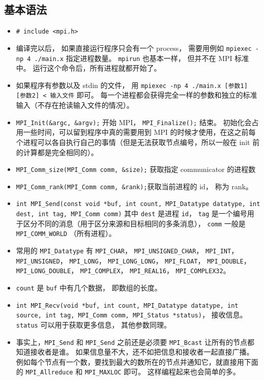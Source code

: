 \subsection{基本语法}
\begin{itemize}
\item \verb|# include <mpi.h>|
\item 编译完以后， 如果直接运行程序只会有一个 process， 需要用例如 \verb|mpiexec -np 4 ./main.x| 指定进程数量。 \verb|mpirun| 也基本一样， 但并不在 MPI 标准中。 运行这个命令后，所有进程就都开始了。
\item 如果程序有参数以及 stdin 的文件， 用 \verb`mpiexec -np 4 ./main.x [参数1] [参数2] < 输入文件` 即可。 每一个进程都会获得完全一样的参数和独立的标准输入（不存在抢读输入文件的情况）。
\item \verb|MPI_Init(&argc, &argv);| 开始 MPI， \verb|MPI_Finalize();| 结束。 初始化会占用一些时间，可以留到程序中真的需要用到 MPI 的时候才使用，在这之前每个进程可以各自执行自己的事情（但是无法获取节点编号，所以一般在 init 前的计算都是完全相同的）。
\item \verb|MPI_Comm_size(MPI_Comm comm, &size);| 获取指定 communicator 的进程数
\item \verb|MPI_Comm_rank(MPI_Comm comm, &rank);|获取当前进程的 id， 称为 rank。
\item \verb|int MPI_Send(const void *buf, int count, MPI_Datatype datatype, int dest, int tag, MPI_Comm comm)| 其中 \verb|dest| 是进程 \verb|id|， \verb|tag| 是一个编号用于区分不同的消息（用于区分来源和目标相同的多条消息）， \verb|comm| 一般是 \verb|MPI_COMM_WORLD| （所有进程）。
\item 常用的 \verb|MPI_Datatype| 有 \verb|MPI_CHAR|， \verb|MPI_UNSIGNED_CHAR|， \verb|MPI_INT|， \verb|MPI_UNSIGNED|， \verb|MPI_LONG|， \verb|MPI_LONG_LONG|， \verb|MPI_FLOAT|， \verb|MPI_DOUBLE|， \verb|MPI_LONG_DOUBLE|， \verb|MPI_COMPLEX|， \verb|MPI_REAL16|， \verb|MPI_COMPLEX32|。
\item \verb|count| 是 \verb|buf| 中有几个数据， 即数组的长度。
\item \verb|int MPI_Recv(void *buf, int count, MPI_Datatype datatype, int source, int tag, MPI_Comm comm, MPI_Status *status)|， 接收信息。 \verb|status| 可以用于获取更多信息， 其他参数同理。
\item 事实上，\verb`MPI_Send` 和 \verb`MPI_Send` 之前还是必须要 \verb`MPI_Bcast` 让所有的节点都知道接收者是谁。 如果信息量不大，还不如把信息和接收者一起直接广播。例如每个节点有一个数，要找到最大的数所在的节点并通知它，就直接用下面的 \verb`MPI_Allreduce` 和 \verb`MPI_MAXLOC` 即可。 这样编程起来也会简单的多。

\end{itemize}
